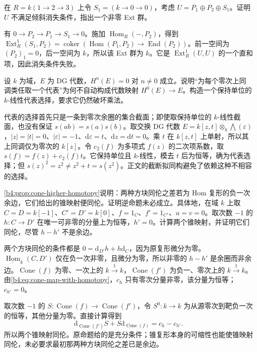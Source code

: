 \begin{optionalexercise}\label{b4:ex:20-a3-replace-wrong-simple}
	在 \(R=k(1\to2\to3)\) 上令 \(S_1=(k\to0\to0)\)，考虑 \(U=P_1\oplus P_2\oplus S_1\)。证明 \(U\) 不满足倾斜消失条件，指出一个非零 Ext 群。
\end{optionalexercise}
\begin{solution}
	有 \(0\to P_2\to P_1\to S_1\to0\)。施加 \(\operatorname{Hom}_R(-,P_2)\)，得到 \(\operatorname{Ext}^1_R(S_1,P_2)=\operatorname{coker}(\operatorname{Hom}(P_1,P_2)\to\operatorname{End}(P_2))\)。前一空间为 \((P_2)_1=0\)，后一空间为 \(k\)，所以该 Ext 群为 \(k\)。它是 \(\operatorname{Ext}^1_R(U,U)\) 的一个直和项，因此消失条件失败。
\end{solution}

\begin{optionalexercise}\label{b4:ex:20-formality-is-zigzag}
	设 \(k\) 为域，\(E\) 为 DG 代数，\(H^n(E)=0\) 对 \(n\ne0\) 成立。说明“为每个零次上同调类任取一个代表”为何不自动构成代数映射 \(H^0(E)\to E\)。构造一个保持单位的 \(k\)-线性代表选择，要求它仍然破坏乘法。
\end{optionalexercise}
\begin{solution}
	代表的选择首先只是一条到零次余圈的集合截面；即使取保持单位的 \(k\)-线性截面，也没有保证 \(s(ab)=s(a)s(b)\)。取交换 DG 代数 \(E=k[z,t]\otimes_k\bigwedge(\varepsilon)\)，\(|z|=|t|=0\)、\(|\varepsilon|=-1\)、\(\mathrm{d}\varepsilon=t\)、\(\mathrm{d}z=\mathrm{d}t=0\)。乘 \(t\) 在 \(k[z,t]\) 上单射，所以其上同调仅为零次的 \(k[z]\)。令 \(c_2(f)\) 为多项式 \(f(z)\) 的二次项系数，取 \(s(f)=f(z)+c_2(f)t\)。它保持单位且 \(k\)-线性，模去 \(t\) 后为恒等，确为代表选择；但 \(s(z)^2=z^2\ne z^2+t=s(z^2)\)。正文的截断拟同构避免了依赖这种不相容的选择。
\end{solution}

\begin{optionalexercise}\label{b4:ex:20-cone-homotopy-change}
	\cref{b4:prop:cone-higher-homotopy}说明：两种方块同伦之差若为 Hom 复形的负一次余边，它们给出的锥映射便同伦。证明逆命题未必成立。具体地，在域 \(k\) 上取 \(C=D=k[-1]\)、\(C'=D'=k[0]\)、\(f=1_C\)、\(f'=1_{C'}\)、\(u=v=0\)。取次数 \(-1\) 的 \(h:C\to D'\) 在唯一可非零的分量上为恒等，\(h'=0\)。计算两个锥映射，并证明它们同伦，尽管 \(h-h'\) 不是余边。
\end{optionalexercise}
\begin{solution}
	两个方块同伦的条件都是 \(0=\mathrm{d}_{D'}h+h\mathrm{d}_C\)，因为原复形微分为零。\(\underline{\operatorname{Hom}}_k(C,D')\) 仅在负一次非零，且微分为零，所以非零的 \(h-h'\) 是余圈而非余边。\(\operatorname{Cone}(f)\) 为零、一次上的 \(k\xrightarrow{1}k\)，\(\operatorname{Cone}(f')\) 为负一、零次上的 \(k\xrightarrow{1}k\)。由\eqref{b4:eq:cone-map-with-homotopy}，\(c_h\) 只有零次分量非零，该分量为恒等；\(c_{h'}=0\)。

	取次数 \(-1\) 的 \(S:\operatorname{Cone}(f)\to\operatorname{Cone}(f')\)，令 \(S^0:k\to k\) 为从源零次到靶负一次的恒等，其他分量为零。直接计算得到
	\[
		\mathrm{d}_{\operatorname{Cone}(f')}S+S\mathrm{d}_{\operatorname{Cone}(f)} =c_h-c_{h'}.
	\]
	所以两个锥映射同伦。原命题给的是充分条件；锥复形本身的可缩性也能使锥映射同伦，未必要求最初那两种方块同伦之差已是余边。
\end{solution}

